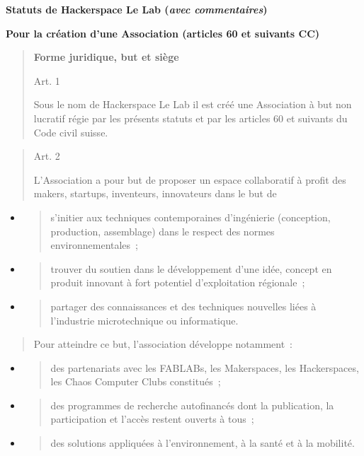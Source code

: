 \documentclass[10pt]{article}
\author{Steve Huguenin-Elie}
\date{\today}
\providecommand{\tightlist}{%
  \setlength{\itemsep}{0pt}\setlength{\parskip}{0pt}}
\begin{document}

\textbf{Statuts de Hackerspace Le Lab (\emph{avec commentaires})}

\textbf{Pour la création d'une Association (articles 60 et suivants CC)}

\begin{quote}
\textbf{Forme juridique, but et siège}

Art. 1

Sous le nom de Hackerspace Le Lab il est créé une Association à but non lucratif
régie par les présents statuts et par les articles 60 et suivants du
Code civil suisse.

\end{quote}
\begin{quote}
Art. 2

L'Association a pour but de proposer un espace collaboratif à profit des makers, startups, inventeurs, innovateurs dans le but de
\end{quote}
\begin{itemize}
  \tightlist
  \item
  \begin{quote}
    s'initier aux techniques contemporaines d'ingénierie (conception, production, assemblage) dans le respect des normes environnementales~;
  \end{quote}
  \item
  \begin{quote}
    trouver du soutien dans le développement d'une idée, concept en produit innovant à fort potentiel d'exploitation régionale~;
  \end{quote}
  \item
  \begin{quote}
    partager des connaissances et des techniques nouvelles liées à l'industrie microtechnique ou informatique.
  \end{quote}
\end{itemize}

\begin{quote}
Pour atteindre ce but, l'association développe notamment~:
\end{quote}
\begin{itemize}
  \tightlist
  \item \begin{quote}
    des partenariats avec les FABLABs, les Makerspaces, les Hackerspaces, les Chaos Computer Clubs constitués~;
  \end{quote}
  \item \begin{quote}
    des programmes de recherche autofinancés dont la publication, la participation et l'accès restent ouverts à tous~;
  \end{quote}
  \item \begin{quote}
    des solutions appliquées à l'environnement, à la santé et à la mobilité.
  \end{quote}
\end{itemize}
\end{document}
